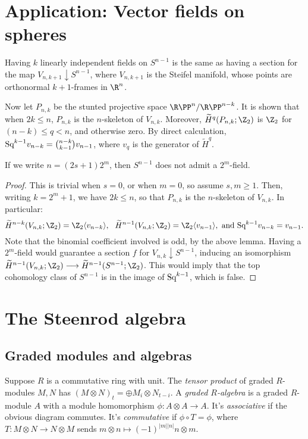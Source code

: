 \documentclass[11pt]{article}
\begin{document}
{\section{Application: Vector fields on spheres}
Having $k$ linearly independent fields on $S^{n-1}$ is the same as having a section for the map $V_{n,k+1}\downarrow S^{n-1}$, where $V_{n,k+1}$ is the Steifel manifold, whose points are orthonormal $k+1$-frames in $\R^n$. 

Now let $P_{n,k}$ be the stunted projective space $\RP^n/\RP^{n-k}$. It is shown that when $2k\leq n$, $P_{n,k}$ is the $n$-skeleton of $V_{n,k}$. Moreover, $\widetilde H^q(P_{n,k};\Z_2)$ is $\Z_2$ for $(n-k)\leq q<n$, and otherwise zero. By direct calculation, $\textup{Sq}^{k-1}v_{n-k}=\binom{n-k}{k-1}v_{n-1}$, where $v_q$ is the generator of $\widetilde H^q$.
\begin{thm*}
If we write $n=(2s+1)2^m$, then $S^{n-1}$ does not admit a $2^m$-field.
\end{thm*}
\begin{proof}
This is trivial when $s=0$, or when $m=0$, so assume $s,m\geq1$. Then, writing $k=2^m+1$, we have $2k\leq n$, so that $P_{n,k}$ is the $n$-skeleton of $V_{n,k}$. In particular: \[\widetilde H^{n-k}(V_{n,k};\Z_2)=\Z_2\langle v_{n-k}\rangle,\ \ \widetilde H^{n-1}(V_{n,k};\Z_2)=\Z_2\langle v_{n-1}\rangle,\text{ and }\Squ^{k-1}v_{n-k}=v_{n-1}.\]
Note that the binomial coefficient involved is odd, by the above lemma.
Having a $2^m$-field would guarantee a section $f$ for $V_{n,k}\downarrow S^{n-1}$, inducing an  isomorphism $\widetilde H^{n-1}(V_{n,k};\Z_2)\to\widetilde H^{n-1}(S^{n-1};\Z_2)$. This would imply that the top cohomology class of $S^{n-1}$ is in the image of $\textup{Sq}^{k-1}$, which is false.
\end{proof}

\section{The Steenrod algebra}
\subsection{Graded modules and algebras}
Suppose $R$ is a commutative ring with unit. The \emph{tensor product} of graded $R$-modules $M,N$ has $(M\otimes N)_t=\oplus M_{i}\otimes N_{t-i}$. A \emph{graded $R$-algebra} is a graded $R$-module $A$ with a module homomorphism $\phi:A\otimes A\to A$. It's \emph{associative} if the obvious diagram commutes. It's \emph{commutative} if $\phi\circ T=\phi$, where $T:M\otimes N\to N\otimes M$ sends $m\otimes n\mapsto (-1)^{|m||n|}n\otimes m$.

}
\end{document}
